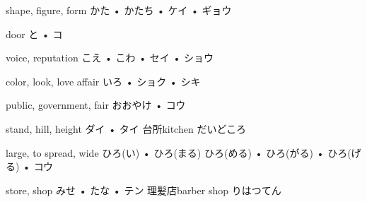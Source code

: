 



\setcounter{cardnum}{97}

		{shape, figure, form}
		{かた • かたち • ケイ • ギョウ}
		{}{}
		{}{}
		{}{}
		{}{}
		{}{}

		{door}
		{と • コ}
		{}{}
		{}{}
		{}{}
		{}{}
		{}{}

		{voice, reputation}
		{こえ • こわ • セイ • ショウ}
		{}{}
		{}{}
		{}{}
		{}{}
		{}{}

		{color, look, love affair}
		{いろ • ショク • シキ}
		{}{}
		{}{}
		{}{}
		{}{}
		{}{}

		{public, government, fair}
		{おおやけ • コウ}
		{}{}
		{}{}
		{}{}
		{}{}
		{}{}

		{stand, hill, height}
		{ダイ • タイ}
		{台所}{kitchen だいどころ}
		{}{}
		{}{}
		{}{}
		{}{}

		{large, to spread, wide}
		{ひろ(い) • ひろ(まる) ひろ(める) • ひろ(がる) • ひろ(げる) • コウ}
		{}{}
		{}{}
		{}{}
		{}{}
		{}{}

		{store, shop}
		{みせ • たな • テン}
		{理髪店}{barber shop りはつてん}
		{}{}
		{}{}
		{}{}
		{}{}

